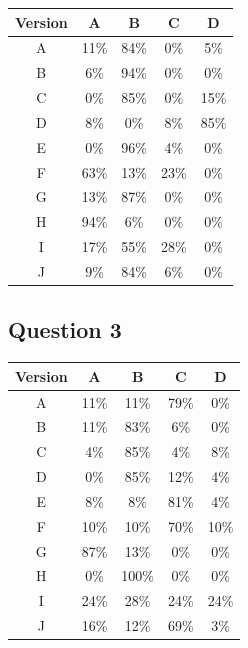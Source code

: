 \documentclass[12pt, a4paper]{article}
\begin{document}
	\begin{table}[H]
		\centering
		\renewcommand{\arraystretch}{1.3}
		\begin{tabular}{ccccc}
			\toprule
			\rowcolor{primary}
			\color{white}\textbf{Version} &
			\color{white}\textbf{A} &
			\color{white}\textbf{B} &
			\color{white}\textbf{C} &
			\color{white}\textbf{D} \\
			\midrule
			\rowcolor{rowA} A & 11\% & 84\% &  0\% &  5\% \\
			\rowcolor{rowB} B &  6\% & 94\% &  0\% &  0\% \\
			\rowcolor{rowA} C &  0\% & 85\% &  0\% & 15\% \\
			\rowcolor{rowB} D &  8\% &  0\% &  8\% & 85\% \\
			\rowcolor{rowA} E &  0\% & 96\% &  4\% &  0\% \\
			\rowcolor{rowB} F & 63\% & 13\% & 23\% &  0\% \\
			\rowcolor{rowA} G & 13\% & 87\% &  0\% &  0\% \\
			\rowcolor{rowB} H & 94\% &  6\% &  0\% &  0\% \\
			\rowcolor{rowA} I & 17\% & 55\% & 28\% &  0\% \\
			\rowcolor{rowB} J &  9\% & 84\% &  6\% &  0\% \\
			\bottomrule
		\end{tabular}
	\end{table}
	
	\subsection{Question 3}
	
	\begin{table}[H]
		\centering
		\renewcommand{\arraystretch}{1.3}
		\begin{tabular}{ccccc}
			\toprule
			\rowcolor{primary}
			\color{white}\textbf{Version} &
			\color{white}\textbf{A} &
			\color{white}\textbf{B} &
			\color{white}\textbf{C} &
			\color{white}\textbf{D} \\
			\midrule
			\rowcolor{rowA} A & 11\% & 11\% & 79\% &  0\% \\
			\rowcolor{rowB} B & 11\% & 83\% &  6\% &  0\% \\
			\rowcolor{rowA} C &  4\% & 85\% &  4\% &  8\% \\
			\rowcolor{rowB} D &  0\% & 85\% & 12\% &  4\% \\
			\rowcolor{rowA} E &  8\% &  8\% & 81\% &  4\% \\
			\rowcolor{rowB} F & 10\% & 10\% & 70\% & 10\% \\
			\rowcolor{rowA} G & 87\% & 13\% &  0\% &  0\% \\
			\rowcolor{rowB} H &  0\% &100\% &  0\% &  0\% \\
			\rowcolor{rowA} I & 24\% & 28\% & 24\% & 24\% \\
			\rowcolor{rowB} J & 16\% & 12\% & 69\% &  3\% \\
			\bottomrule
		\end{tabular}
	\end{table}
	
\end{document}
